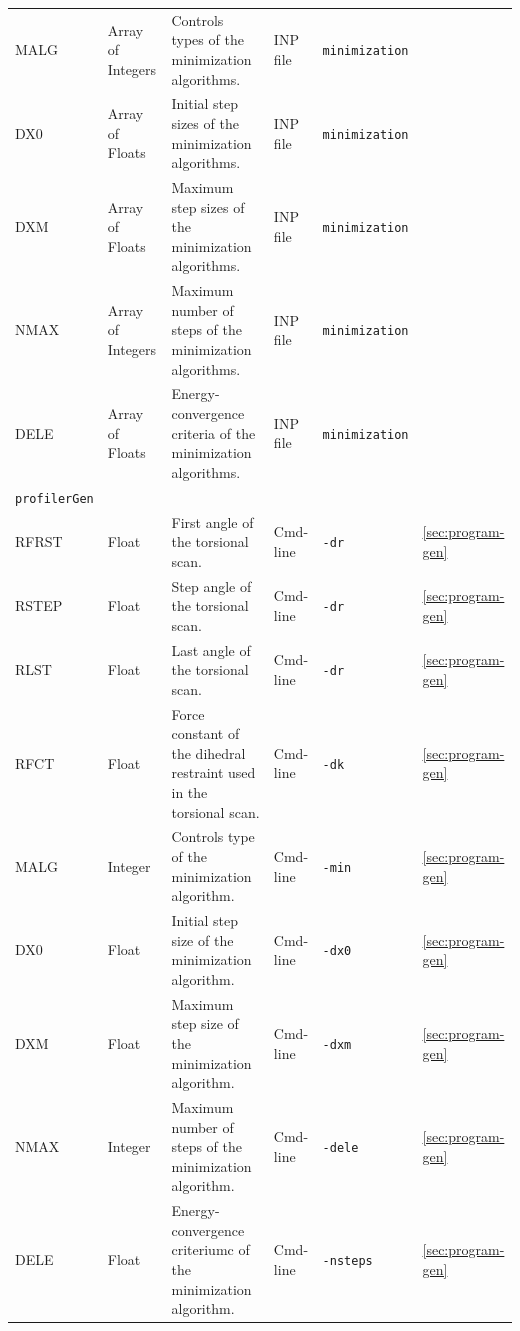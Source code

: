 \documentclass[10pt,a4paper,openany]{memoir}
\numberwithin{equation}{section}
\newcommand{\profilergen}[0]{\texttt{profilerGen}}
\begin{document}
\begin{landscape}
\begin{center}
\begin{longtable}{llllll}
      MALG & Array of Integers & Controls types of the minimization algorithms. & INP file & \texttt{minimization} & \autopageref{descr:malg}\\
      DX0 & Array of Floats & Initial step sizes of the minimization algorithms. & INP file & \texttt{minimization} & \autopageref{descr:dx0}\\
      DXM & Array of Floats & Maximum step sizes of the minimization algorithms. & INP file & \texttt{minimization} & \autopageref{descr:dxm}\\
      NMAX & Array of Integers & Maximum number of steps of the minimization algorithms. & INP file & \texttt{minimization} & \autopageref{descr:nmax}\\
      DELE & Array of Floats & Energy-convergence criteria of the minimization algorithms. & INP file & \texttt{minimization} & \autopageref{descr:dele}\\
      \midrule
      \profilergen{} &  &  &  &  & \\ \midrule
      RFRST & Float & First angle of the torsional scan. & Cmd-line & \texttt{-dr} & \autoref{sec:program-gen}\\
      RSTEP & Float & Step angle of the torsional scan. & Cmd-line & \texttt{-dr} & \autoref{sec:program-gen}\\
      RLST & Float & Last angle of the torsional scan. & Cmd-line & \texttt{-dr} & \autoref{sec:program-gen}\\
      RFCT & Float & Force constant of the dihedral restraint used in the torsional scan. & Cmd-line & \texttt{-dk} & \autoref{sec:program-gen}\\
      MALG & Integer & Controls type of the minimization algorithm. & Cmd-line & \texttt{-min} & \autoref{sec:program-gen}\\
      DX0 & Float & Initial step size of the minimization algorithm. & Cmd-line & \texttt{-dx0} & \autoref{sec:program-gen}\\
      DXM & Float & Maximum step size of the minimization algorithm. & Cmd-line & \texttt{-dxm} & \autoref{sec:program-gen}\\
      NMAX & Integer & Maximum number of steps of the minimization algorithm. & Cmd-line & \texttt{-dele} & \autoref{sec:program-gen}\\
      DELE & Float & Energy-convergence criteriumc of the minimization algorithm. & Cmd-line & \texttt{-nsteps} & \autoref{sec:program-gen}\\
      \bottomrule
      \end{longtable}
    \end{center}
\end{landscape}
\end{document}
